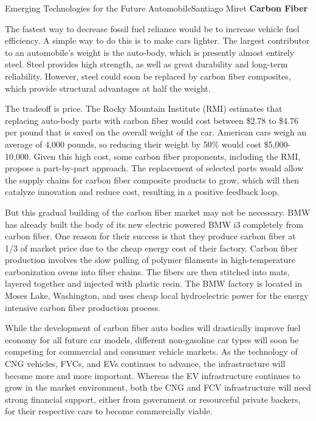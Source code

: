 \documentclass{papertex}
\begin{document}
\begin{news}{2}{Emerging Technologies for the Future Automobile}{Santiago Miret}{}{}
\textbf{Carbon Fiber}

The fastest way to decrease fossil fuel reliance would be to increase vehicle fuel efficiency. A simple way to do this is to make cars lighter. The largest contributor to an automobile's weight is the auto-body, which is presently almost entirely steel. Steel provides high strength, as well as great durability and long-term reliability. However, steel could soon be replaced by carbon fiber composites, which provide structural advantages at half the weight.

The tradeoff is price. The Rocky Mountain Institute (RMI) estimates that replacing auto-body parts with carbon fiber would cost between \$2.78 to \$4.76 per pound that is saved on the overall weight of the car. American cars weigh an average of 4,000 pounds, so reducing their weight by 50\% would cost \$5,000-10,000. Given this high cost, some carbon fiber proponents, including the RMI, propose a part-by-part approach. The replacement of selected parts would allow the supply chains for carbon fiber composite products to grow, which will then catalyze innovation and reduce cost, resulting in a positive feedback loop.

But this gradual building of the carbon fiber market may not be necessary. BMW has already built the body of its new electric powered BMW i3 completely from carbon fiber. One reason for their success is that they produce carbon fiber at 1/3 of market price due to the cheap energy cost of their factory. Carbon fiber production involves the slow pulling of polymer filaments in high-temperature carbonization ovens into fiber chains. The fibers are then stitched into mats, layered together and injected with plastic resin. The BMW factory is located in Moses Lake, Washington, and uses cheap local hydroelectric power for the energy intensive carbon fiber production process.

While the development of carbon fiber auto bodies will drastically improve fuel economy for all future car models, different non-gasoline car types will soon be competing for commercial and consumer vehicle markets. As the technology of CNG vehicles, FVCs, and EVs continues to advance, the infrastructure will become more and more important. Whereas the EV infrastructure continues to grow in the market environment, both the CNG and FCV infrastructure will need strong financial support, either from government or resourceful private backers, for their respective cars to become commercially viable.

\subsubsection*{}


\end{news}
\end{document}
